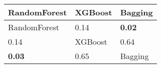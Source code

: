 \begin{tabular}{lll}
\toprule
RandomForest & XGBoost & Bagging \\
\midrule
RandomForest & 0.14 & \textbf{0.02} \\
0.14 & XGBoost & 0.64 \\
\textbf{0.03} & 0.65 & Bagging \\
\bottomrule
\end{tabular}
